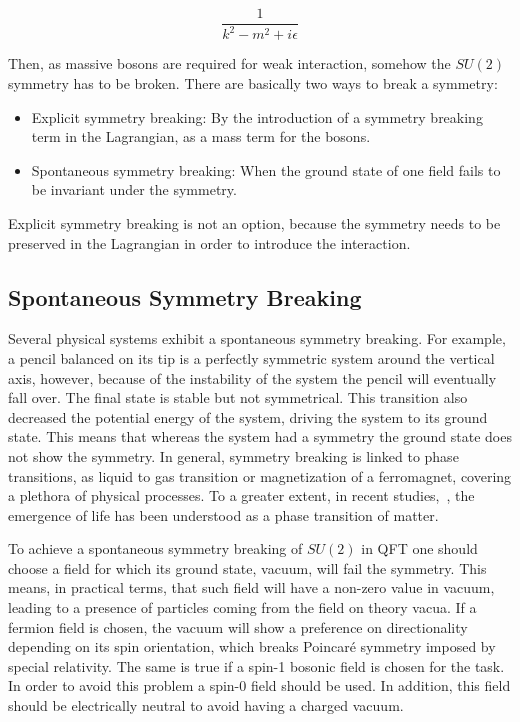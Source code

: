 \begin{equation}
  \label{eq:Propa}
  \frac{1}{k^{2}-m^{2}+i\epsilon}
\end{equation}

Then, as massive bosons are required for weak interaction, somehow the $SU(2)$ symmetry has to be broken. There are basically two ways to break a symmetry: 
\begin{itemize}
\item Explicit symmetry breaking: By the introduction of a symmetry breaking term in the Lagrangian, as a mass term for the bosons.
\item Spontaneous symmetry breaking: When the ground state of one field fails to be invariant under the symmetry. 
\end{itemize}

Explicit symmetry breaking is not an option, because the symmetry needs to be preserved in the Lagrangian in order to introduce the interaction.

\subsection{Spontaneous Symmetry Breaking}
\label{sec:SSB}

Several physical systems exhibit a spontaneous symmetry breaking. For example, a pencil balanced on its tip is a perfectly symmetric system around the vertical axis, however, because of the instability of the system the pencil will eventually fall over. The final state is stable but not symmetrical. This transition also decreased the potential energy of the system, driving the system to its ground state. This means that whereas the system had a symmetry the ground state does not show the symmetry. In general, symmetry breaking is linked to phase transitions, as liquid to gas transition or magnetization of a ferromagnet, covering a plethora of physical processes. To a greater extent, in recent studies,~\cite{2015arXiv150302776M}, the emergence of life has been understood as a phase transition of matter. 

To achieve a spontaneous symmetry breaking of $SU(2)$ in QFT one should choose a field for which its ground state, vacuum, will fail the symmetry. This means, in practical terms, that such field will have a non-zero value in vacuum, leading to a presence of particles coming from the field on theory vacua. If a fermion field is chosen, the vacuum will show a preference on directionality depending on its spin orientation, which breaks Poincar\'{e} symmetry imposed by special relativity. The same is true if a spin-1 bosonic field is chosen for the task. In order to avoid this problem a spin-0 field should be used. In addition, this field should be electrically neutral to avoid having a charged vacuum.

